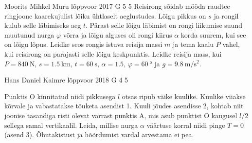 \documentclass[11pt]{article}
\begin{document}
{%
{Moorits Mihkel Muru} %
{lõppvoor} %
{2017} %
{G 5} %
{5} %
{
\ifStatement
Reisirong sõidab mööda raudtee ringjoone kaarekujulist lõiku ühtlaselt aeglustudes. Lõigu pikkus on $s$ ja rongil kulub selle läbimiseks aeg $t$. Pärast selle lõigu läbimist on rongi liikumise suund muutunud nurga $\varphi$ võrra ja lõigu alguses oli rongi kiirus $\alpha$ korda suurem, kui see on lõigu lõpus. Leidke seos rongis istuva reisija massi $m$ ja tema kaalu $P$ vahel, kui reisirong on parajasti selle lõigu keskpunktis. Leidke reisija mass, kui $P=\SI{840}{\newton}$, $s=\SI{1.5}{\kilo\meter}$, $t=\SI{60}{\second}$, $\alpha=\num{1.5}$, $\varphi=\SI{60}{\degree}$ ja $g=\SI{9.8}{\meter\per\second\squared}$.
\fi
}

{Hans Daniel Kaimre} %
{lõppvoor} %
{2018} %
{G 4} %
{5} %
{
\ifStatement
\begin{figure}
\vspace{-5pt}
\end{figure}

Punktis O kinnitatud niidi pikkusega $l$ otsas ripub väike kuulike. Kuulike viiakse kõrvale ja vabastatakse tõuketa asendist 1. Kuuli jõudes asendisse 2, kohtab niit joonise tasandiga risti olevat varrast punktis A, mis asub punktist O kaugusel $l/2$ sellega samal vertikaalil. Leida, millise nurga $\alpha$ väärtuse korral niidi pinge $T=0$ (asend 3). Õhutakistust ja hõõrdumist vardal arvestama ei pea.
\fi
}

}
\end{document}
